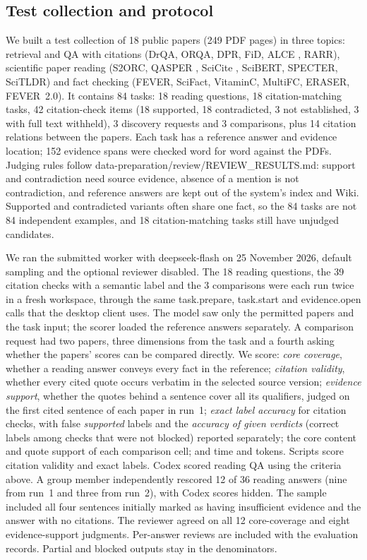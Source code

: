 \documentclass{article}
\newcommand{\code}[1]{{\ttfamily\small\hyphenchar\font=-1\relax #1}}
\begin{document}
\subsection{Test collection and protocol}
\label{sec:eval-setup}
\begin{samepage}
We built a test collection of 18 public papers (249 PDF pages) in three topics: retrieval and QA with
citations (DrQA, ORQA, DPR, FiD, ALCE \citep{alce}, RARR), scientific paper reading (S2ORC, QASPER
\citep{qasper}, SciCite \citep{scicite}, SciBERT, SPECTER, SciTLDR) and fact checking (FEVER, SciFact,
VitaminC, MultiFC, ERASER, FEVER~2.0). It contains 84 tasks: 18 reading questions, 18 citation-matching
tasks, 42 citation-check items (18 supported, 18 contradicted, 3 not established, 3 with full text
withheld), 3 discovery requests and 3 comparisons, plus 14 citation relations between the papers.
Each task has a reference answer and evidence location; 152 evidence spans were checked word for word
against the PDFs. Judging rules follow
\code{data-preparation/review/REVIEW\_RESULTS.md}: support and contradiction need source evidence,
absence of a mention is not contradiction, and reference answers are kept out of the system's index
and Wiki. Supported and contradicted variants often share one fact, so the 84 tasks are not 84
independent examples, and 18 citation-matching tasks still have unjudged candidates.\par
\end{samepage}

We ran the submitted worker with \code{deepseek-flash} on 25 November 2026, default sampling and the
optional reviewer disabled. The 18 reading questions, the 39 citation checks with a semantic label
and the 3 comparisons were each run twice in a fresh workspace, through the same \code{task.prepare},
\code{task.start} and \code{evidence.open} calls that the desktop client uses. The model saw only the
permitted papers and the task input; the scorer loaded the reference answers separately. A
comparison request had two papers, three dimensions from the task and a fourth asking whether the
papers' scores can be compared directly. We score: \emph{core coverage}, whether a reading answer
conveys every fact in the reference; \emph{citation validity}, whether every cited quote occurs
verbatim in the selected source version; \emph{evidence support}, whether the quotes behind a
sentence cover all its qualifiers, judged on the first cited sentence of each paper in run~1;
\emph{exact label accuracy} for citation checks, with false \emph{supported} labels and the
\emph{accuracy of given verdicts} (correct labels among checks that were not blocked) reported
separately; the core content and quote support of each comparison cell; and time and tokens.
Scripts score citation validity and exact labels. Codex scored reading QA using the criteria above.
A group member independently rescored 12 of 36 reading answers (nine from run~1 and three from
run~2), with Codex scores hidden. The sample included all four sentences initially marked as having
insufficient evidence and the answer with no citations. The reviewer agreed on all 12 core-coverage
and eight evidence-support judgments. Per-answer reviews are included with the evaluation records.
Partial and blocked outputs stay in the denominators.
\end{document}
